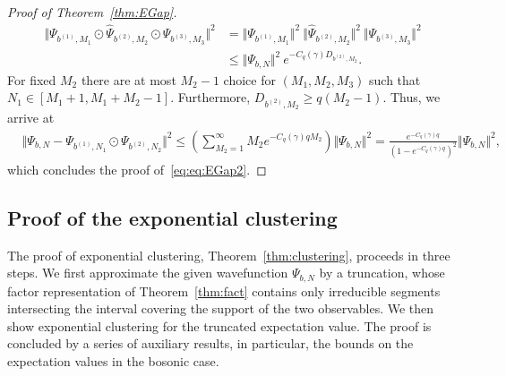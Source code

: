 \documentclass[letterpaper, DIV=17]{scrartcl}
\numberwithin{equation}{section}
\theoremstyle{definition}
\begin{document}
\begin{proof}[Proof of Theorem~\ref{thm:EGap}]
\begin{align*}
	\Vert \Psi_{b^{(1)},M_1} \odot \widehat{\Psi}_{b^{(2)}, M_2} \odot \Psi_{b^{(3)},M_3} \Vert^2 & = \Vert \Psi_{b^{(1)},M_1} \Vert^2 \ \Vert  \widehat{\Psi}_{b^{(2)}, M_2} \Vert^2 \ \Vert \Psi_{b^{(3)},M_3} \Vert^2 \\
	& \leq \Vert \Psi_{b,N}\Vert^2 \ e^{-C_q(\gamma)D_{b^{(2)}, M_2}} .
\end{align*}
For fixed $M_2$ there are at most $M_2-1$ choice for $(M_1, M_2, M_3)$ such that $N_1\in [M_1+1, M_1+M_2-1]$. Furthermore, $D_{b^{(2)}, M_2}\geq q(M_2-1)$. Thus, we arrive at 
\begin{align*}
	&\Vert \Psi_{b,N}-\Psi_{b^{(1)},N_1}  \odot \Psi_{b^{(2)},N_2} \Vert^2
	\leq \left( \sum_{M_2=1}^{\infty} M_2 e^{-C_q(\gamma)q M_2}\right) \Vert \Psi_{b,N}\Vert^2
	= \frac{e^{-C_q(\gamma)q}}{\left(1-e^{-C_q(\gamma)q}\right)^2} \Vert \Psi_{b,N}\Vert^2,
\end{align*}
which concludes the proof of~\eqref{eq:eq:EGap2}.
\end{proof}


\subsection{Proof of the exponential clustering}\label{sec:cluster}
The proof of exponential clustering, Theorem~\ref{thm:clustering}, proceeds in three steps. We first approximate the given wavefunction $ \Psi_{b,N} $ by a truncation, whose factor representation of Theorem~\eqref{thm:fact} contains only irreducible segments intersecting the interval covering the support of the two observables. We then show exponential clustering for the truncated expectation value. The proof is concluded by a series of auxiliary results, in particular, the bounds on the expectation values in the bosonic case. 

		
\end{document}
